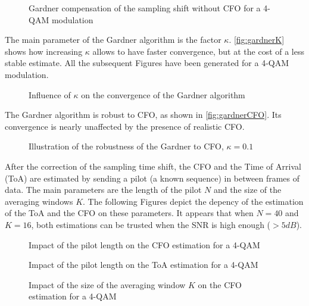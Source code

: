 \begin{figure}[H]
    \centering
    
    \caption{Gardner compensation of the sampling shift without CFO for a 4-QAM modulation}
    \label{fig:gardner}
\end{figure}

The main parameter of the Gardner algorithm is the factor $\kappa$. \autoref{fig:gardnerK} shows how increasing $\kappa$ allows to have faster convergence, but at the cost of a less stable estimate. All the subsequent Figures have been generated for a 4-QAM modulation.

\begin{figure}[H]
    \centering
    
    \caption{Influence of $\kappa$ on the convergence of the Gardner algorithm}
    \label{fig:gardnerK}
\end{figure}

The Gardner algorithm is robust to CFO, as shown in \autoref{fig:gardnerCFO}. Its convergence is nearly unaffected by the presence of realistic CFO.

\begin{figure}[H]
    \centering
    
    \caption{Illustration of the robustness of the Gardner to CFO, $\kappa = 0.1$}
    \label{fig:gardnerCFO}
\end{figure}

After the correction of the sampling time shift, the CFO and the Time of Arrival (ToA) are estimated by sending a pilot (a known sequence) in between frames of data. The main parameters are the length of the pilot $N$ and the size of the averaging windows $K$. The following Figures depict the depency of the estimation of the ToA and the CFO on these parameters. It appears that when $N=40$ and $K=16$, both estimations can be trusted when the SNR is high enough ($> \si{5}{dB}$).

\begin{figure}[H]
    \centering
    
    \caption{Impact of the pilot length on the CFO estimation for a 4-QAM}
    \label{fig:dftoaN}
\end{figure}

\begin{figure}[H]
    \centering
    
    \caption{Impact of the pilot length on the ToA estimation for a 4-QAM}
    \label{fig:shiftoaN}
\end{figure}

\begin{figure}[H]
    \centering
    
    \caption{Impact of the size of the averaging window $K$ on the CFO estimation for a 4-QAM}
\end{figure}

